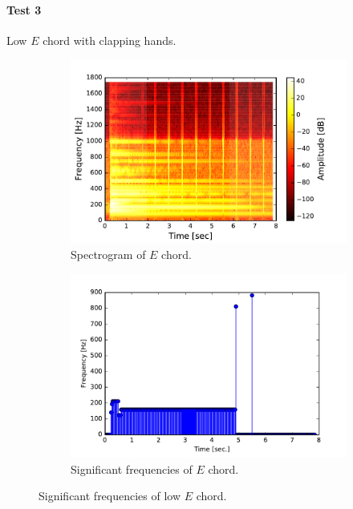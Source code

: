 \paragraph{Test 3} Low $E$ chord with clapping hands.
\begin{figure}[H]
\centering
\begin{subfigure}{0.49\textwidth}
\centering
\includegraphics[width=\textwidth]{figures/validation/systemtest/final_spec2.pdf}
\caption{Spectrogram of $E$ chord.}
\label{fig:final_spec2}
\end{subfigure}
\begin{subfigure}{0.49\textwidth}
\centering
\includegraphics[width=\textwidth]{figures/validation/systemtest/final_peak2.pdf}
\caption{Significant frequencies of $E$ chord.}
\label{fig:final_peak2}
\end{subfigure}
\caption{Significant frequencies of low $E$ chord.}
\label{fig:final_2}
\end{figure}

